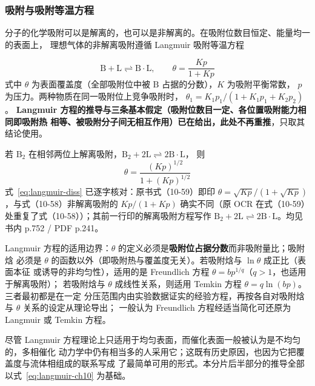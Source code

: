\subsubsection{吸附与吸附等温方程}

分子的化学吸附可以是解离的，也可以是非解离的。在吸附位数目恒定、能量均一的表面上，
理想气体的非解离吸附遵循 Langmuir 吸附等温方程

\begin{equation}
\mathrm{B}+\mathrm{L}\rightleftharpoons \mathrm{B{\cdot}L},
\qquad
\theta=\frac{Kp}{1+Kp}
\label{eq:langmuir-ch10}
\end{equation}
式中 $\theta$ 为表面覆盖度（全部吸附位中被 $\mathrm{B}$ 占据的分数），$K$ 为吸附平衡常数，
$p$ 为压力。两种物质在同一吸附位上竞争吸附时，
$\theta_1=K_1p_1/(1+K_1p_1+K_2p_2)$。
\textbf{Langmuir 方程的推导与三条基本假定（吸附位数目一定、各位置吸附能力相同即吸附热
相等、被吸附分子间无相互作用）已在给出，此处不再重推}，只取其结论使用。

若 $\mathrm{B}_2$ 在相邻两位上解离吸附，$\mathrm{B_2}+2\mathrm{L}\rightleftharpoons 2\mathrm{B{\cdot}L}$，
则
\begin{equation}
\theta=\frac{(Kp)^{1/2}}{1+(Kp)^{1/2}}
\label{eq:langmuir-diss}
\end{equation}
式~\eqref{eq:langmuir-diss} 已逐字核对：原书式（10-59）即印
$\theta=\sqrt{Kp}/(1+\sqrt{Kp})$，与式（10-58）非解离吸附的 $Kp/(1+Kp)$ 确实不同（原 OCR
在式（10-59）处重复了式（10-58））；其前一行印的解离吸附方程写作
$\mathrm{B_2}+2\mathrm{L}\rightleftharpoons2\mathrm{B{\cdot}L}$。均见书内 p.752 / PDF p.241。

\begin{keycond}
Langmuir 方程的适用边界：$\theta$ 的定义必须是\textbf{吸附位占据分数}而非吸附量比；吸附焓
必须是 $\theta$ 的函数以外（即吸附热与覆盖度无关）。若吸附焓与 $\ln\theta$ 成正比（表面本征
或诱导的非均匀性），适用的是 Freundlich 方程 $\theta=bp^{1/q}$（$q>1$，也适用于解离吸附）；
若吸附焓与 $\theta$ 成线性关系，则适用 Temkin 方程 $\theta=q\ln(bp)$。三者最初都是在一定
分压范围内由实验数据证实的经验方程，再按各自对吸附焓与 $\theta$ 关系的设定从理论导出；
一般认为 Freundlich 方程经适当简化可还原为 Langmuir 或 Temkin 方程。
\end{keycond}

尽管 Langmuir 方程理论上只适用于均匀表面，而催化表面一般被认为是不均匀的，多相催化
动力学中仍有相当多的人采用它；这既有历史原因，也因为它把覆盖度与流体相组成的联系写成
了最简单可用的形式。本分片后半部分的推导全部以式~\eqref{eq:langmuir-ch10} 为基础。

